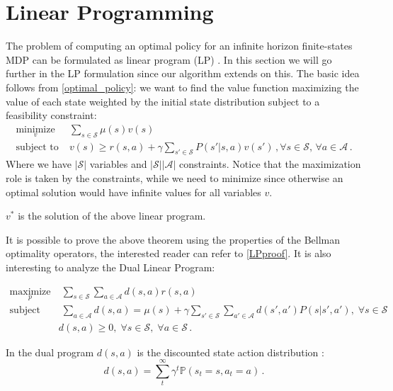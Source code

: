 \section{Linear Programming} \label{sec:lin_prog}
The problem of computing an optimal policy for an infinite horizon finite-states MDP can be formulated as linear program (LP) \citep{depenoux_probabilistic_1963}. In this section we will go further in the LP formulation since our algorithm extends on this.
The basic idea follows from \cref{optimal_policy}: we want to find the value function maximizing the value of each state weighted by the initial state distribution subject to a feasibility constraint:
\begin{align*}
	\underset{v}{\text{minimize}} & \; \sum_{s \in \mathcal{S}} \mu(s) v(s) \\
	\text{subject to} &  \; v(s) \geq r(s,a) + \gamma \sum_{s' \in \mathcal{S}} P(s' | s,a) v(s') \, , \forall s \in \mathcal{S}, \, \forall a \in \mathcal{A} \, .
\end{align*} 
Where we have $|\mathcal{S}|$ variables and $|\mathcal{S}| |\mathcal{A}|$ constraints. Notice that the maximization role is taken by the constraints, while we need to minimize since otherwise an optimal solution would have infinite values for all variables $v$.
\begin{theorem}
$v^*$ is the solution of the above linear program.
\end{theorem} \label{lpth}	


It is possible to prove the above theorem using the properties of the Bellman optimality operators, the interested reader can refer to \cref{LPproof}.
It is also interesting to analyze the Dual Linear Program:

\begin{align*}
	\underset{p}{\text{maximize}} & \; \sum_{s \in \mathcal{S}} \sum_{a \in \mathcal{A}} d(s,a)r(s,a) \\
	\text{subject to} &  \; \sum_{a \in \mathcal{A}} d(s,a) = \mu(s) + \gamma \sum_{s' \in \mathcal{S}} \sum_{a' \in \mathcal{A}} d(s',a') P(s | s', a'), \; \forall s \in \mathcal{S} \\
	& d(s,a) \geq 0, \;  \forall s \in \mathcal{S}, \; \forall a \in \mathcal{S} \, .
\end{align*} 

In the dual program $d(s,a)$ is the discounted state action distribution \citep{pol_grad_func_approx}:
\begin{equation}
	d(s,a) = \sum_t^\infty \gamma^t \mathbb{P}(s_t = s, a_t = a) \, .
\end{equation}


